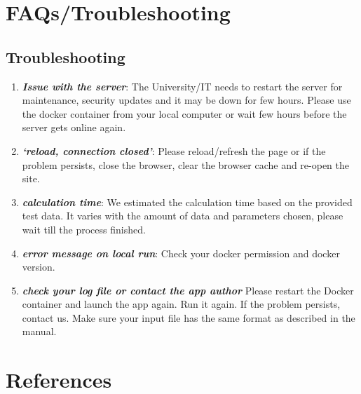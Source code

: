 \documentclass[
  a4paper,
  DIV=11,
  numbers=noendperiod,
  oneside,
  open=any]{scrreport}
\providecommand{\tightlist}{%
  \setlength{\itemsep}{0pt}\setlength{\parskip}{0pt}}\usepackage{longtable,booktabs,array}
\begin{document}
\chapter{FAQs/Troubleshooting}\label{sec-faq}

\section{Troubleshooting}\label{troubleshooting}

\begin{enumerate}
\def\labelenumi{\arabic{enumi}.}
\tightlist
\item
  \textbf{\emph{Issue with the server}}: The University/IT needs to
  restart the server for maintenance, security updates and it may be
  down for few hours. Please use the docker container from your local
  computer or wait few hours before the server gets online again.
\item
  \textbf{\emph{`reload, connection closed'}}: Please reload/refresh the
  page or if the problem persists, close the browser, clear the browser
  cache and re-open the site.
\item
  \textbf{\emph{calculation time}}: We estimated the calculation time
  based on the provided test data. It varies with the amount of data and
  parameters chosen, please wait till the process finished.
\item
  \textbf{\emph{error message on local run}}: Check your docker
  permission and docker version.
\item
  \textbf{\emph{check your log file or contact the app author}} Please
  restart the Docker container and launch the app again. Run it again.
  If the problem persists, contact us. Make sure your input file has the
  same format as described in the manual.
\end{enumerate}

\chapter*{References}\label{references}


\printbibliography[heading=none]
\end{document}
